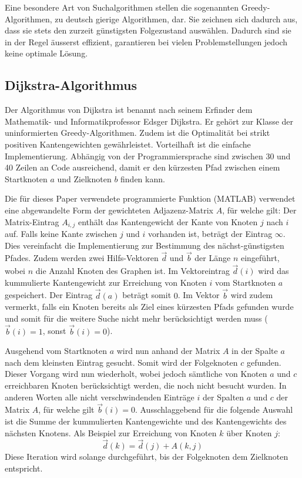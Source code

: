 Eine besondere Art von Suchalgorithmen stellen die sogenannten Greedy-Algorithmen, zu deutsch gierige Algorithmen, dar. Sie zeichnen sich dadurch aus, dass sie stets den zurzeit günstigsten Folgezustand auswählen. Dadurch sind sie in der Regel äusserst effizient, garantieren bei vielen Problemstellungen jedoch keine optimale Lösung.

\subsection{Dijkstra-Algorithmus}
Der Algorithmus von Dijkstra ist benannt nach seinem Erfinder dem Mathematik- und Informatikprofessor Edsger Dijkstra. Er gehört zur Klasse der uninformierten Greedy-Algorithmen. Zudem ist die Optimalität bei strikt positiven Kantengewichten gewährleistet.
Vorteilhaft ist die einfache Implementierung. Abhängig von der Programmiersprache sind zwischen 30 und 40 Zeilen an Code ausreichend, damit er den kürzesten Pfad zwischen einem Startknoten $a$ und Zielknoten $b$ finden kann. 

Die für dieses Paper verwendete programmierte Funktion (MATLAB) verwendet eine abgewandelte Form der gewichteten Adjazenz-Matrix $A$, für welche gilt:
Der Matrix-Eintrag $A_{i,j}$ enthält das Kantengewicht der Kante von Knoten $j$ nach $i$ auf. Falls keine Kante zwischen $j$ und $i$ vorhanden ist, beträgt der Eintrag $\infty$. Dies vereinfacht die Implementierung zur Bestimmung des nächst-günstigsten Pfades.
Zudem werden zwei Hilfs-Vektoren $\vec{d}$ und $\vec{b}$ der Länge $n$ eingeführt, wobei $n$ die Anzahl Knoten des Graphen ist. Im Vektoreintrag $\vec{d}(i)$ wird das kummulierte Kantengewicht zur Erreichung von Knoten $i$ vom Startknoten $a$ gespeichert. Der Eintrag $\vec{d}(a)$ beträgt somit $0$. Im Vektor $\vec{b}$ wird zudem vermerkt, falls ein Knoten bereits als Ziel eines kürzesten Pfads gefunden wurde und somit für die weitere Suche nicht mehr berücksichtigt werden muss ($\vec{b}(i)=1$, sonst $\vec{b}(i)=0$).

Ausgehend vom Startknoten $a$ wird nun anhand der Matrix $A$ in der Spalte $a$ nach dem kleinsten Eintrag gesucht. Somit wird der Folgeknoten $c$ gefunden. Dieser Vorgang wird nun wiederholt, wobei jedoch sämtliche von Knoten $a$ und $c$ erreichbaren Knoten berücksichtigt werden, die noch nicht besucht wurden. In anderen Worten alle nicht verschwindenden Einträge $i$ der Spalten $a$ und $c$ der Matrix $A$, für welche gilt $\vec{b}(i)=0$. Ausschlaggebend für die folgende Auswahl ist die Summe der kummulierten Kantengewichte und des Kantengewichts des nächsten Knotens. Als Beispiel zur Erreichung von Knoten $k$ über Knoten $j$:
\begin{equation}
\vec{d}(k)=\vec{d}(j)+A(k,j)
\end{equation}
Diese Iteration wird solange durchgeführt, bis der Folgeknoten dem Zielknoten entspricht.

